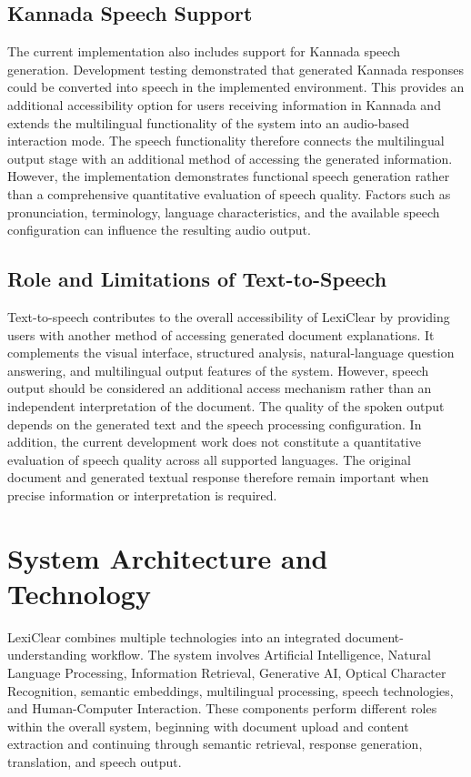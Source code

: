 \documentclass[12pt,a4paper,oneside]{report}
\begin{document}
\subsection{Kannada Speech Support}

The current implementation also includes support for Kannada speech
generation. Development testing demonstrated that generated Kannada
responses could be converted into speech in the implemented environment.
This provides an additional accessibility option for users receiving
information in Kannada and extends the multilingual functionality of the
system
into an audio-based interaction mode. The speech functionality therefore
connects the multilingual output stage with an additional method of accessing
the generated information. However, the implementation demonstrates
functional speech generation rather than a comprehensive quantitative
evaluation of speech quality. Factors such as pronunciation, terminology,
language characteristics, and the available speech configuration can
influence the resulting audio output.

\subsection{Role and Limitations of Text-to-Speech}

Text-to-speech contributes to the overall accessibility of LexiClear by
providing users with another method of accessing generated document
explanations. It complements the visual interface, structured analysis,
natural-language question answering, and multilingual output features of the
system. However, speech output should be considered an additional access
mechanism rather than an independent interpretation of the document. The
quality of the spoken output depends on the generated text and the speech
processing configuration. In addition, the current development work does not
constitute a quantitative evaluation of speech quality across all supported
languages. The original document and generated textual response therefore
remain important when precise information or interpretation is required.

\section{System Architecture and Technology}

LexiClear combines multiple technologies into an integrated document-understanding
workflow. The system involves Artificial Intelligence, Natural Language
Processing, Information Retrieval, Generative AI, Optical Character
Recognition, semantic embeddings, multilingual processing, speech
technologies, and Human-Computer Interaction. These components perform
different roles within the overall system, beginning with document upload and
content extraction and continuing through semantic retrieval, response
generation, translation, and speech output. 
\end{document}
